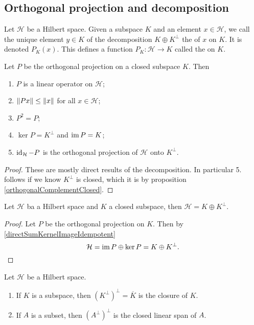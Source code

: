 \subsection{Orthogonal projection and decomposition}
\begin{definition}
Let $\mathcal{H}$ be a Hilbert space. Given a subspace $K$ and an element $x \in \mathcal{H}$, we call the unique element $y\in K$ of the decomposition $K\oplus K^\perp$ the  of $x$ on $K$. It is denoted $P_K(x)$. This defines a function $P_K:\mathcal{H}\to K$ called the  on $K$.
\end{definition}

\begin{proposition}
Let $P$ be the orthogonal projection on a closed subspace $K$. Then
\begin{enumerate}
\item $P$ is a linear operator on $\mathcal{H}$;
\item $\lVert Px\rVert\leq \lVert x\rVert$ for all $x\in\mathcal{H}$;
\item $P^2 = P$;
\item $\ker P = K^\perp$ and $\operatorname{im} P = K$;
\item $\operatorname{id}_\mathcal{H} - P$ is the orthogonal projection of $\mathcal{H}$ onto $K^\perp$.
\end{enumerate}
\end{proposition}
\begin{proof}
These are mostly direct results of the decomposition. In particular 5. follows if we know $K^\perp$ is closed, which it is by proposition \ref{orthogonalComplementClosed}.
\end{proof}
\begin{corollary} \label{HilbertClosedSpaceOrthogonalDecomposition}
Let $\mathcal{H}$ ba a Hilbert space and $K$ a closed subspace, then $\mathcal{H} = K\oplus K^\perp$.
\end{corollary}
\begin{proof}
Let $P$ be the orthogonal projection on $K$. Then by \ref{directSumKernelImageIdempotent}
\[ \mathcal{H} = \operatorname{im} P \oplus \ker P = K\oplus K^\perp. \]
\end{proof}
\begin{corollary} \label{doubleComplementClosure}
Let $\mathcal{H}$ be a Hilbert space.
\begin{enumerate}
\item If $K$ is a subspace, then $(K^\perp)^\perp = \overline{K}$ is the closure of $K$.
\item If $A$ is a subset, then $(A^\perp)^\perp$ is the closed linear span of $A$.
\end{enumerate}
\end{corollary}
